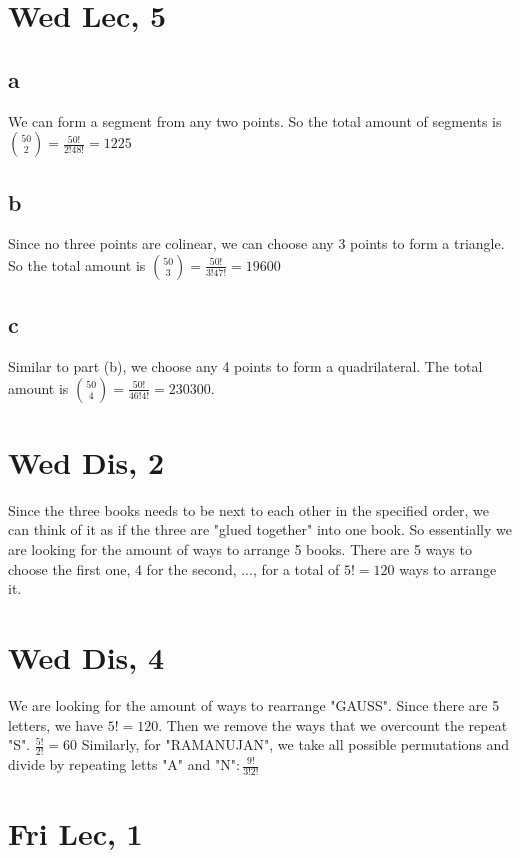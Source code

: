 \documentclass[12pt]{article}
\begin{document}
\section{Wed Lec, 5}

\subsection{a}
We can form a segment from any two points. So the total amount of segments is $\binom{50}{2} = \frac{50!}{2!48!}=1225$

\subsection{b}
Since no three points are colinear, we can choose any 3 points to form a triangle. So the total amount is $\binom{50}{3} = \frac{50!}{3!47!} = 19600$

\subsection{c}
Similar to part (b), we choose any 4 points to form a quadrilateral. The total amount is $\binom {50} {4} = \frac{50!}{46!4!} = 230300$.

\newpage

\section{Wed Dis, 2}
Since the three books needs to be next to each other in the specified order, we can think of it as if the three are "glued together" into one book. So essentially we are looking for the amount of ways to arrange 5 books.
\newline
There are 5 ways to choose the first one, 4 for the second, ..., for a total of $5! = 120$ ways to arrange it.

\section{Wed Dis, 4}
We are looking for the amount of ways to rearrange "GAUSS". Since there are 5 letters, we have $5!=120$. Then we remove the ways that we overcount the repeat "S". $\frac{5!}{2!} = 60$
\newline
Similarly, for "RAMANUJAN", we take all possible permutations and divide by repeating letts "A" and "N"$: \frac{9!}{3!2!}$

\newpage

\section{Fri Lec, 1}
\end{document}
